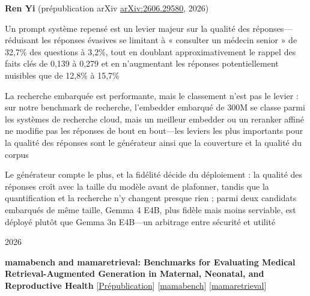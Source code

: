         \vspace{0.10 cm}
        \begin{onecolentry}
            \textbf{Ren Yi} (prépublication arXiv \href{https://arxiv.org/abs/2606.29580}{arXiv:2606.29580}, 2026)
        \end{onecolentry}
        \vspace{0.10 cm}

        \begin{onecolentry}
        \begin{highlights}
            \item Un prompt système repensé est un levier majeur sur la qualité des réponses---réduisant les réponses évasives se limitant à « consulter un médecin senior » de 32,7\% des questions à 3,2\%, tout en doublant approximativement le rappel des faits clés de 0,139 à 0,279 et en n'augmentant les réponses potentiellement nuisibles que de 12,8\% à 15,7\%
            \item La recherche embarquée est performante, mais le classement n'est pas le levier : sur notre benchmark de recherche, l'embedder embarqué de 300M se classe parmi les systèmes de recherche cloud, mais un meilleur embedder ou un reranker affiné ne modifie pas les réponses de bout en bout---les leviers les plus importants pour la qualité des réponses sont le générateur ainsi que la couverture et la qualité du corpus
            \item Le générateur compte le plus, et la fidélité décide du déploiement : la qualité des réponses croît avec la taille du modèle avant de plafonner, tandis que la quantification et la recherche n'y changent presque rien ; parmi deux candidats embarqués de même taille, Gemma 4 E4B, plus fidèle mais moins serviable, est déployé plutôt que Gemma 3n E4B---un arbitrage entre sécurité et utilité
        \end{highlights}
        \end{onecolentry}

        \vspace{0.2 cm}
        \begin{twocolentry}[0.9 cm] {2026}

\textbf{mamabench and mamaretrieval: Benchmarks for Evaluating Medical Retrieval-Augmented Generation in Maternal, Neonatal, and Reproductive Health} \mbox{[\href{https://arxiv.org/abs/2606.29467}{Prépublication}]} \mbox{[\href{https://huggingface.co/datasets/nmrenyi/mamabench}{mamabench}]} \mbox{[\href{https://huggingface.co/datasets/nmrenyi/mamaretrieval}{mamaretrieval}]}

\end{twocolentry}

